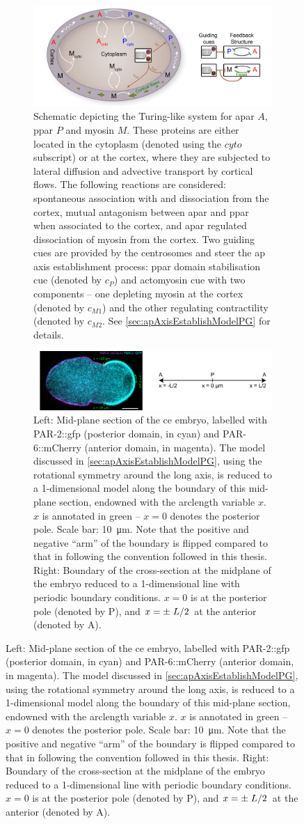 \begin{figure}
\centering
\begin{subfigure}{\textwidth}
    \centering
    \includegraphics[width=\textwidth]{ActiveMatterModel/FigureModelPG/modelPG.pdf}
    \caption{Schematic depicting the Turing-like system for \ac{apar} $A$, \ac{ppar} $P$ and myosin $M$. These proteins are either located in the cytoplasm (denoted using the $cyto$ subscript) or at the cortex, where they are subjected to lateral diffusion and advective transport by cortical flows. The following reactions are considered: spontaneous association with and dissociation from the cortex, mutual antagonism between \ac{apar} and \ac{ppar} when associated to the cortex, and \ac{apar} regulated dissociation of myosin from the cortex. Two guiding cues are provided by the centrosomes and steer the \ac{ap} axis establishment process: \ac{ppar} domain stabilisation cue (denoted by $c_P$) and actomyosin cue with two components -- one depleting myosin at the cortex (denoted by $c_{M1}$) and the other regulating contractility (denoted by $c_{M2}$. See \autoref{sec:apAxisEstablishModelPG} for details.}
    \label{subfig:apAxisEstablishModelPG-schematic}
\end{subfigure}
\hfill
\begin{subfigure}{\textwidth}
    \centering
    \includegraphics[width=\textwidth]{ActiveMatterModel/FigureModelPG/par2Par6SymmetricArclength.pdf}
    \caption{Left: Mid-plane section of the \acs{ce} embryo, labelled with PAR-2::\ac{gfp} (posterior domain, in cyan) and PAR-6::mCherry (anterior domain, in magenta). The model discussed in \autoref{sec:apAxisEstablishModelPG}, using the rotational symmetry around the long axis, is reduced to a 1-dimensional model along the boundary of this mid-plane section, endowned with the arclength variable $x$. $x$ is annotated in green -- $x = 0$ denotes the posterior pole. Scale bar: \SI{10}{\micro\meter}. Note that the positive and negative \enquote{arm} of the boundary is flipped compared to that in \cite{gross2019guiding} following the convention followed in this thesis. Right: Boundary of the cross-section at the midplane of the embryo reduced to a 1-dimensional line with periodic boundary conditions. $x = 0$ is at the posterior pole (denoted by P), and $x = \pm \flatfrac{L}{2}$ at the anterior (denoted by A).}

\end{subfigure}
\end{figure}
